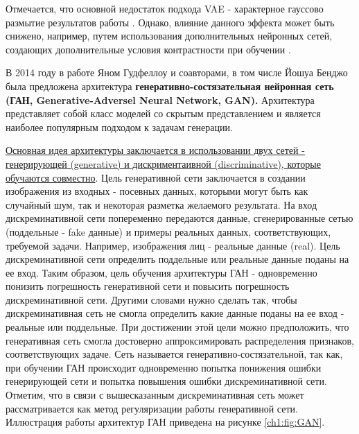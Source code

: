 \documentclass[12pt]{article}
\begin{document}
\begin{sloppypar}
Отмечается, что основной недостаток подхода VAE - характерное гауссово размытие результатов работы \cite{ harshvardhan2020comprehensive}. Однако, влияние данного эффекта может быть снижено, например, путем использования  дополнительных нейронных сетей, создающих дополнительные условия контрастности при обучении \cite{mescheder2017adversarial}.

В 2014 году в работе \cite{goodfellow2014generative} Яном Гудфеллоу и соавторами, в том числе Йошуа Бенджо была предложена архитектура \textbf{генеративно-состязательная нейронная сеть (ГАН, Generative-Adversel Neural Network, GAN).} Архитектура представляет собой класс моделей со скрытым представлением и является наиболее популярным подходом к задачам генерации. 

\uline{Основная идея архитектуры заключается в использовании двух сетей - генерирующей (generative) и дискриментаивной (discriminative), которые обучаются совместно}.  Цель генеративной сети заключается в создании изображения из входных - посевных данных, которыми могут быть как случайный шум, так и некоторая разметка желаемого результата. На вход дискреминативной сети попеременно передаются данные, сгенерированные сетью (поддельные - fake данные) и примеры реальных данных, соответствующих, требуемой задачи. Например, изображения лиц - реальные данные (real). Цель дискреминативной сети определить поддельные или реальные данные поданы на ее вход. Таким образом, цель обучения архитектуры ГАН - одновременно понизить погрешность генеративной сети и повысить погрешность дискреминативной сети. Другими словами нужно сделать так, чтобы дискреминативная сеть не смогла определить какие данные поданы на ее вход - реальные или поддельные. При достижении этой цели можно предположить, что генеративная сеть смогла достоверно аппроксимировать распределения признаков, соответствующих задаче. Сеть называется генеративно-состязательной, так как, при обучении ГАН происходит одновременно попытка понижения ошибки генерирующей сети и попытка повышения ошибки дискреминативной сети. Отметим, что в связи с вышесказанным дискреминативная сеть может рассматривается как метод регуляризации работы генеративной сети. Иллюстрация работы архитектур ГАН приведена на рисунке \ref{ch1:fig:GAN}.


\end{sloppypar}
\end{document}
